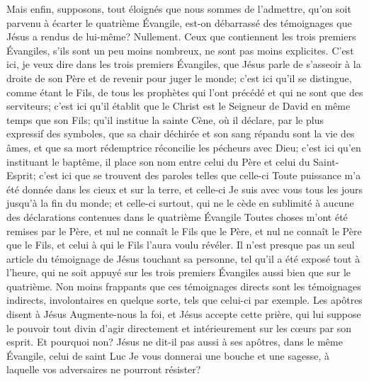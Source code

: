 Mais enfin, supposons, tout éloignés que nous sommes de l’admettre,
qu’on soit parvenu à écarter le quatrième Évangile, est-on débarrassé des témoignages que Jésus a rendus de lui-même?
Nullement. Ceux que contiennent les trois premiers Évangiles, s’ils sont un peu moins nombreux, ne sont pas moins explicites.
C’est ici, je veux dire dans les trois premiers Évangiles, que Jésus parle de s’asseoir à la droite de son Père et de revenir pour juger le monde;
c’est ici qu’il se distingue, comme étant le Fils, de tous les prophètes qui l’ont précédé et qui ne sont que des serviteurs;
c’est ici qu’il établit que le Christ est le Seigneur de David en même temps que son Fils;
qu’il institue la sainte Cène, où il déclare, par le plus expressif des symboles, que sa chair déchirée et son sang répandu sont la vie des âmes, et que sa mort rédemptrice réconcilie les pécheurs avec Dieu;
c’est ici qu’en instituant le baptême, il place son nom entre celui du Père et celui du Saint-Esprit;
c’est ici que se trouvent des paroles telles que celle-ci\frcolon{}
\Og{} Toute puissance m’a été donnée dans les cieux et sur la terre\Fg{},
et celle-ci\frcolon{} \Og{} Je suis avec vous tous les jours jusqu’à la fin du monde\Fg{};
et celle-ci surtout, qui ne le cède en sublimité à aucune des déclarations contenues dans le quatrième Évangile\frcolon{}
\Og{} Toutes choses m’ont été remises par le Père, et nul ne connaît le Fils que le Père,
et nul ne connaît le Père que le Fils, et celui à qui le Fils l’aura voulu révéler.\Fg{}
Il n’est presque pas un seul article du témoignage de Jésus touchant sa personne,
tel qu’il a été exposé tout à l’heure, qui ne soit appuyé sur les trois premiers Évangiles
aussi bien que sur le quatrième.
Non moins frappants que ces témoignages directs sont les témoignages indirects,
involontaires en quelque sorte, tels que celui-ci par exemple.
Les apôtres disent à Jésus\frcolon{}
\Og{} Augmente-nous la foi\Fg{},
et Jésus accepte cette prière, qui lui suppose le pouvoir
tout divin d’agir directement et intérieurement sur les cœurs par son esprit.
Et pourquoi non? Jésus ne dit-il pas aussi à ses apôtres, dans le même Évangile, celui de saint Luc\frcolon{}
\Og{} Je vous donnerai une bouche et une sagesse, à laquelle vos adversaires ne pourront résister\Fg{}?
